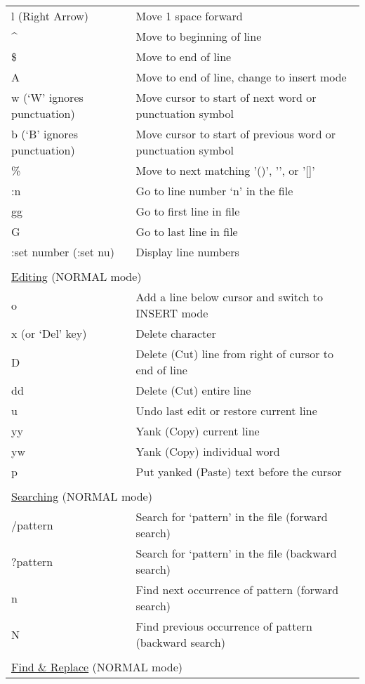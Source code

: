 \documentclass[11pt,a4paper,oneside]{article}
\begin{document}
\begin{table}
\begin{tabular}{p{5.5cm} l}
l (Right Arrow) & Move 1 space forward \\
\^{} & Move to beginning of line \\
\$ & Move to end of line \\
A & Move to end of line, change to insert mode \\
w (`W' ignores punctuation) & Move cursor to start of next word or punctuation symbol \\
b (`B' ignores punctuation) & Move cursor to start of previous word or punctuation symbol \\
\% & Move to next matching '()', '{}', or '[]' \\
:n & Go to line number `n' in the file \\
gg & Go to first line in file \\
G & Go to last line in file \\
:set number (:set nu) & Display line numbers \\
 & \\[-1.5ex]
\multicolumn{2}{l}{\underline{Editing} (NORMAL mode)} \\
o & Add a line below cursor and switch to INSERT mode \\
x (or `Del' key) & Delete character \\
D & Delete (Cut) line from right of cursor to end of line \\
dd & Delete (Cut) entire line \\
u & Undo last edit or restore current line \\
yy & Yank (Copy) current line \\
yw & Yank (Copy) individual word \\
p & Put yanked (Paste) text before the cursor \\
 & \\[-1.5ex]
\multicolumn{2}{l}{\underline{Searching} (NORMAL mode)} \\
/pattern & Search for `pattern' in the file (forward search) \\
?pattern & Search for `pattern' in the file (backward search) \\
n & Find next occurrence of pattern (forward search) \\
N & Find previous occurrence of pattern (backward search) \\
 & \\[-1.5ex]
\multicolumn{2}{l}{\underline{Find \& Replace} (NORMAL mode)} \\

\end{tabular}
\end{table}
\end{document}
